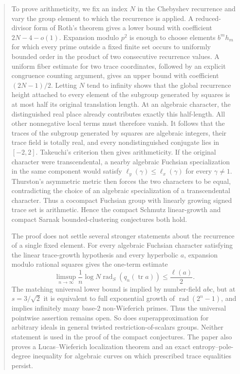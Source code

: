 \documentclass[11pt,reqno]{amsart}
\theoremstyle{definition}
\theoremstyle{remark}
\newcommand{\Tr}{\operatorname{tr}}
\begin{document}
\begin{abstract}
To prove arithmeticity, we fix an index \(N\) in the Chebyshev recurrence
and vary the group element to which the recurrence is applied.  A
reduced-divisor form of Roth's theorem gives a lower bound with coefficient
\(2N-4-o(1)\).  Expansion modulo \(p^2\) is enough to choose elements
\(b^mh_m\) for which every prime outside a fixed finite set occurs to
uniformly bounded order in the product of two consecutive recurrence values.
A uniform fiber estimate for
two trace coordinates, followed by an explicit congruence counting
argument, gives an upper bound with coefficient \((2N-1)/2\).  Letting
\(N\) tend to infinity shows that the global recurrence height attached to
every element of the subgroup generated by squares is at most half its
original translation length.  At an algebraic character, the distinguished
real place already contributes exactly this half-length.  All other
nonnegative local terms must therefore vanish.  It follows that the traces
of the subgroup generated by squares are algebraic integers, their trace
field is totally real, and every nondistinguished conjugate lies in
\([-2,2]\).  Takeuchi's criterion \cite{Takeuchi} then gives arithmeticity.
If the original character were transcendental, a
nearby algebraic Fuchsian specialization in the same component would satisfy
\(\ell_y(\gamma)\le\ell_x(\gamma)\) for every \(\gamma\ne1\).
Thurston's asymmetric metric then forces the two characters to be equal,
contradicting the choice of an algebraic specialization of a transcendental
character.  Thus a cocompact Fuchsian group with linearly growing signed
trace set is arithmetic.  Hence the compact Schmutz linear-growth and compact
Sarnak bounded-clustering conjectures both hold.

The proof does not settle several stronger statements about the recurrence
of a single fixed element.  For every algebraic Fuchsian character satisfying
the linear trace-growth hypothesis and every hyperbolic \(a\), expansion
modulo rational squares gives the one-term estimate
\[
 \limsup_{n\to\infty}\frac1n
 \log N\operatorname{rad}_S(q_n(\Tr a))\le\frac{\ell(a)}2.
\]
The matching universal lower bound is implied by number-field \(abc\), but
at \(s=3/\sqrt2\) it is equivalent to full exponential growth of
\(\operatorname{rad}(2^n-1)\), and implies infinitely many base-\(2\)
non-Wieferich primes.
Thus the universal pointwise assertion remains open.  So does
superapproximation for arbitrary ideals in general twisted
restriction-of-scalars groups.  Neither statement is used in the proof of
the compact conjectures.  The paper also proves a Lucas--Wieferich
localization theorem and an exact entropy--pole-degree inequality for
algebraic curves on which prescribed trace equalities persist.
\end{abstract}
\end{document}
